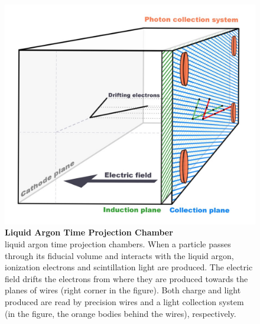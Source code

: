 \begin{figure}[h!]
	\begin{center}
		\includegraphics[scale=0.12]{Figures/LARTPC.jpg}
		\caption[LArTPC]{ {\textbf{Liquid Argon Time Projection Chamber}} \\ liquid argon time projection chambers. When a particle passes through its fiducial volume and interacts with the liquid argon, ionization electrons and scintillation light are produced. The electric field drifts the electrons from where they are produced towards the planes of wires (right corner in the figure). Both charge and light produced are read by precision wires and a light collection system (in the figure, the orange bodies behind the wires), respectively.}
		\label{lartpc}	
	\end{center}
\end{figure}

